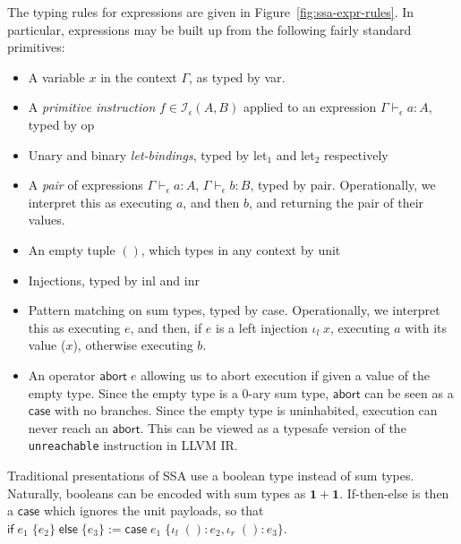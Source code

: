 \documentclass[acmsmall,screen,review]{acmart}
\newcommand{\mc}[1]{\ensuremath{\mathcal{#1}}}
\newcommand{\mb}[1]{\ensuremath{\mathbf{#1}}}
\newcommand{\ms}[1]{\ensuremath{\mathsf{#1}}}
\newcommand{\lto}{:}
\newcommand{\linl}[1]{\iota_l\;{#1}}
\newcommand{\linr}[1]{\iota_r\;{#1}}
\newcommand{\caseexpr}[5]{\ms{case}\;#1\;\{\linl{#2} \lto #3, \linr{#4} \lto #5\}}
\newcommand{\ite}[3]{\ms{if}\;#1\;\{#2\}\;\ms{else}\;\{#3\}}
\newcommand{\hasty}[4]{#1 \vdash_{#2} #3: {#4}}
\newcommand{\brle}[1]{{\textsf{#1}}}
\begin{document}
The typing rules for expressions are given in Figure~\ref{fig:ssa-expr-rules}. In particular,
expressions may be built up from the following fairly standard primitives:
\begin{itemize}
  \item A variable $x$ in the context $\Gamma$, as typed by \brle{var}.
  \item A \emph{primitive instruction} $f \in \mc{I}_\epsilon(A, B)$ applied to an expression
  $\hasty{\Gamma}{\epsilon}{a}{A}$, typed by \brle{op}
  \item Unary and binary \emph{let-bindings}, typed by \brle{let$_1$} and \brle{let$_2$}
  respectively
  \item A \emph{pair} of expressions $\hasty{\Gamma}{\epsilon}{a}{A}$,
  $\hasty{\Gamma}{\epsilon}{b}{B}$, typed by \brle{pair}. Operationally, we interpret this as
  executing $a$, and then $b$, and returning the pair of their values.
  \item An empty tuple $()$, which types in any context by \brle{unit}
  \item Injections, typed by \brle{inl} and \brle{inr}
  \item Pattern matching on sum types, typed by \brle{case}. Operationally, we interpret this as
  executing $e$, and then, if $e$ is a left injection $\iota_l\;x$, executing $a$ with its value
  ($x$), otherwise executing $b$.
  \item An operator $\ms{abort}\;e$ allowing us to abort execution if given a value of the empty
  type. Since the empty type is a 0-ary sum type, $\ms{abort}$ can be seen as a $\ms{case}$ with no
  branches. Since the empty type is uninhabited, execution can never reach an $\ms{abort}$. This can
  be viewed as a typesafe version of the \texttt{unreachable} instruction in LLVM IR. 
\end{itemize}

Traditional presentations of SSA use a boolean type instead of sum types. Naturally, booleans can be
encoded with sum types as $\mb{1} + \mb{1}$. If-then-else is then a $\ms{case}$ which ignores the
unit payloads, so that $\ite{e_1}{e_2}{e_3} := \caseexpr{e_1}{()}{e_2}{()}{e_3}$. 
\end{document}

